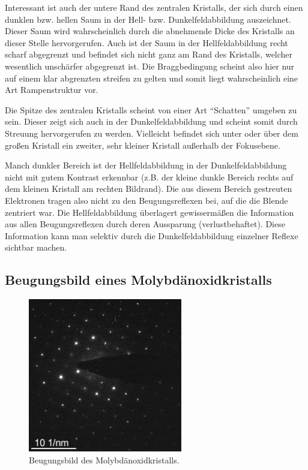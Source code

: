 \documentclass[slug=TEM, room=IFW, supervisor=?, coursedate=23.\ 01.\ 2020]{../../Lab_Report_LaTeX/lab_report}
\begin{document}
Interessant ist auch der untere Rand des zentralen Kristalls, der sich
durch einen dunklen bzw. hellen Saum in der Hell-
bzw. Dunkelfeldabbildung auszeichnet. Dieser Saum wird wahrscheinlich
durch die abnehmende Dicke des Kristalls an dieser Stelle
hervorgerufen. Auch ist der Saum in der Hellfeldabbildung recht scharf
abgegrenzt und befindet sich nicht ganz am Rand des Kristalls, welcher
wesentlich unsch\"arfer abgegrenzt ist. Die Braggbedingung scheint
also hier nur auf einem klar abgrenzten streifen zu gelten und somit
liegt wahrscheinlich eine Art Rampenstruktur vor.

Die Spitze des zentralen Kristalls scheint von einer Art ``Schatten''
umgeben zu sein. Dieser zeigt sich auch in der Dunkelfeldabbildung und
scheint somit durch Streuung hervorgerufen zu werden. Vielleicht
befindet sich unter oder \"uber dem gro\ss{}en Kristall ein zweiter,
sehr kleiner Kristall au\ss{}erhalb der Fokusebene.

Manch dunkler Bereich ist der Hellfeldabbildung in der
Dunkelfeldabbildung nicht mit gutem Kontrast erkennbar (z.B. der
kleine dunkle Bereich rechts auf dem kleinen Kristall am rechten
Bildrand). Die aus diesem Bereich gestreuten Elektronen tragen also
nicht zu den Beugungsreflexen bei, auf die die Blende zentriert war.
Die Hellfeldabbildung \"uberlagert gewisserm\"a\ss{}en die Information
aus allen Beugungsreflexen durch deren Aussparung
(verlustbehaftet). Diese Information kann man selektiv durch die
Dunkelfeldabbildung einzelner Reflexe sichtbar machen.

\subsection{Beugungsbild eines Molybdänoxidkristalls}
\label{sec:beugungmolyb}

\begin{figure}[h]
	\centering
	\includegraphics[width=0.6\textwidth]{../messungen/molybdaen/auswertung/MoO_diffr_5_m.jpg}%
	\caption{Beugungsbild des Molybdänoxidkristalls.}
	\label{fig:molbeug}
\end{figure}
\end{document}
